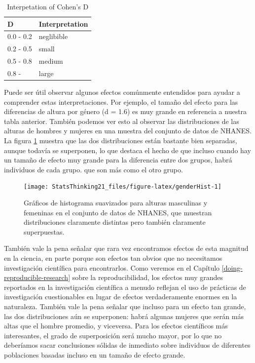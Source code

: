 \documentclass[
  12pt,
]{book}
\begin{document}
\begin{table}

\caption{\label{tab:unnamed-chunk-47}Interpetation of Cohen's D}
\centering
\begin{tabular}[t]{l|l}
\hline
D & Interpretation\\
\hline
0.0 - 0.2 & neglibible\\
\hline
0.2 - 0.5 & small\\
\hline
0.5 - 0.8 & medium\\
\hline
0.8 - & large\\
\hline
\end{tabular}
\end{table}

Puede ser útil observar algunos efectos comúnmente entendidos para ayudar a comprender estas interpretaciones. Por ejemplo, el tamaño del efecto para las diferencias de altura por género (d = 1.6) es muy grande en referencia a nuestra tabla anterior. También podemos ver esto al observar las distribuciones de las alturas de hombres y mujeres en una muestra del conjunto de datos de NHANES. La figura \ref{fig:genderHist} muestra que las dos distribuciones están bastante bien separadas, aunque todavía se superponen, lo que destaca el hecho de que incluso cuando hay un tamaño de efecto muy grande para la diferencia entre dos grupos, habrá individuos de cada grupo. que son más como el otro grupo.

\begin{figure}
\texttt{[image: StatsThinking21\_files/figure-latex/genderHist-1]} \caption{Gráficos de histograma suavizados para alturas masculinas y femeninas en el conjunto de datos de NHANES, que muestran distribuciones claramente distintas pero también claramente superpuestas.}\label{fig:genderHist}
\end{figure}

También vale la pena señalar que rara vez encontramos efectos de esta magnitud en la ciencia, en parte porque son efectos tan obvios que no necesitamos investigación científica para encontrarlos. Como veremos en el Capítulo \ref{doing-reproducible-research} sobre la reproducibilidad, los efectos muy grandes reportados en la investigación científica a menudo reflejan el uso de prácticas de investigación cuestionables en lugar de efectos verdaderamente enormes en la naturaleza. También vale la pena señalar que incluso para un efecto tan grande, las dos distribuciones aún se superponen: habrá algunas mujeres que serán más altas que el hombre promedio, y viceversa. Para los efectos científicos más interesantes, el grado de superposición será mucho mayor, por lo que no deberíamos sacar conclusiones sólidas de inmediato sobre individuos de diferentes poblaciones basadas incluso en un tamaño de efecto grande.
\end{document}
